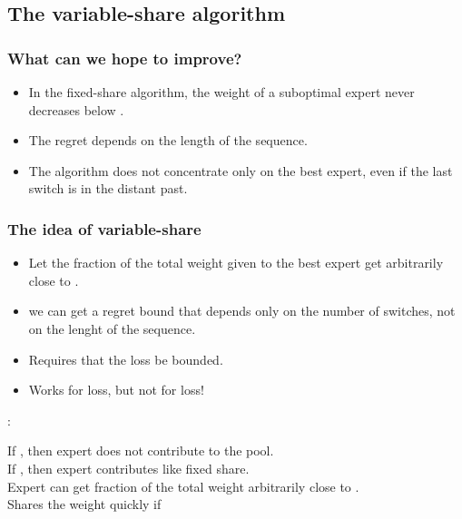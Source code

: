 \documentclass[handout]{beamer}
\begin{document}
\begin{small}
\section{The variable-share algorithm}

\begin{frame}
\frametitle{What can we hope to improve?}
\begin{itemize}
\item In the fixed-share algorithm, the 
weight of a suboptimal expert never decreases below
.
\item The regret depends on the length of the sequence.
\item The algorithm does not concentrate only on the best expert, even
if the last switch is in the distant past.
\end{itemize}
\end{frame}

\begin{frame}
\frametitle{The idea of variable-share}
\begin{itemize}
\item Let the fraction of the total weight given to the 
best expert get arbitrarily close to .
\item we can get a regret bound that depends only on the number of
switches, not on the lenght of the sequence.
\item Requires that the loss be bounded.
\item Works for  loss, but not for  loss!
\end{itemize}
\end{frame}

\begin{frame}
: 

\pause
If , then expert  does not contribute to the pool.\\
\pause
If , then expert  contributes like fixed share.\\
\pause
Expert can get fraction of the total weight arbitrarily close to .\\
\pause
Shares the weight quickly if 
\end{frame}


\end{small}
\end{document}

